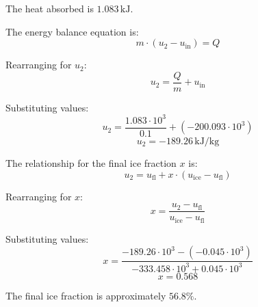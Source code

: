 The heat absorbed is \( 1.083 \, \text{kJ} \).  

The energy balance equation is:  
\[
m \cdot (u_2 - u_{\text{in}}) = Q
\]

Rearranging for \( u_2 \):  
\[
u_2 = \frac{Q}{m} + u_{\text{in}}
\]

Substituting values:  
\[
u_2 = \frac{1.083 \cdot 10^3}{0.1} + (-200.093 \cdot 10^3)
\]  
\[
u_2 = -189.26 \, \text{kJ/kg}
\]

The relationship for the final ice fraction \( x \) is:  
\[
u_2 = u_{\text{fl}} + x \cdot (u_{\text{ice}} - u_{\text{fl}})
\]

Rearranging for \( x \):  
\[
x = \frac{u_2 - u_{\text{fl}}}{u_{\text{ice}} - u_{\text{fl}}}
\]

Substituting values:  
\[
x = \frac{-189.26 \cdot 10^3 - (-0.045 \cdot 10^3)}{-333.458 \cdot 10^3 + 0.045 \cdot 10^3}
\]  
\[
x = 0.568
\]

The final ice fraction is approximately \( 56.8\% \).